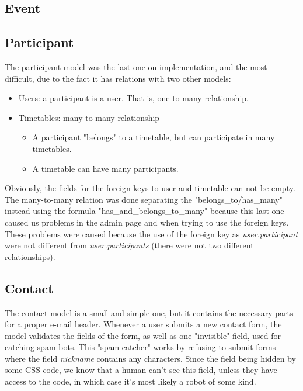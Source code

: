 \subsection{Event}
\subsection{Participant}
The participant model was the last one on implementation, and the most difficult, due to the fact it has relations with two other models:
\begin{itemize} \setlength{\itemsep}{-5pt}
\item Users: a participant is a user. That is, one-to-many relationship.
\item Timetables: many-to-many relationship
\begin{itemize} \setlength{\itemsep}{-5pt}
\item A participant "belongs" to a timetable, but can participate in many timetables.
\item A timetable can have many participants.
\end{itemize}
\end{itemize} 
Obviously, the fields for the foreign keys to user and timetable can not be empty.\\
The many-to-many relation was done separating the "belongs\_to/has\_many" instead using the formula "has\_and\_belongs\_to\_many" because this last one caused us problems in the admin page and when trying to use the foreign keys. These problems were caused  because the use of the foreign key as \textit{user.participant} were not different from \textit{user.participants} (there were not two different relationships).
\subsection{Contact}
The contact model is a small and simple one, but it contains the necessary parts for a proper e-mail header. 
Whenever a user submits a new contact form, the model validates the fields of the form, as well as one "invisible" field, 
used for catching spam bots. This "spam catcher" works by refusing to submit forms where the field \textit{nickname} 
contains any characters. Since the field being hidden by some CSS code, we know that a human can't see this field, unless they have access to the code, in which case it's most likely a robot of some kind.
 
